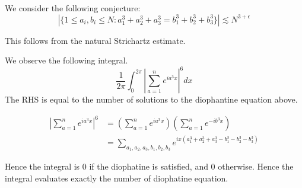 We consider the following conjecture:
\begin{equation*}
    |\{1\leq a_i, b_i\leq N: a_1^3+a_2^3+a_3^3=b_1^3+b_2^3+b_3^3\}|\lesssim N^{3+\epsilon}
\end{equation*}

This follows from the natural Strichartz estimate. 

We observe the following integral.
\begin{equation*}
    \frac{1}{2\pi}\int_0^{2\pi}\left|\sum_{a=1}^ne^{ia^3x}\right|^6dx
\end{equation*}
The RHS is equal to the number of solutions to the diophantine equation above.

\begin{align*}
    \left|\sum_{a=1}^ne^{ia^3x}\right|^6&=(\sum_{a=1}^ne^{ia^3x})(\sum_{a=1}^ne^{-ib^3x})\\
    &=\sum_{a_1, a_2, a_3, b_1, b_2, b_3}e^{ix(a_1^3+a_2^3+a_3^3-b_1^3-b_2^3-b_3^3)}
\end{align*}

Hence the integral is 0 if the diophatine is satisfied, and 0 otherwise. Hence the integral evaluates exactly the number of diophatine equation. 


